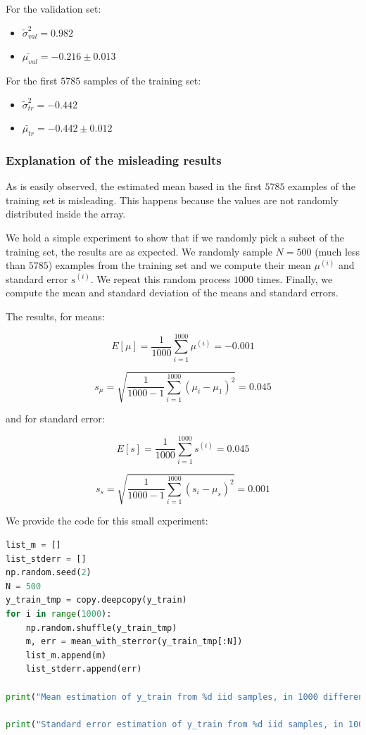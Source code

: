 \documentclass{article}
\begin{document}
For the validation set:
\begin{itemize}
    \item $ \tilde{\sigma}_{val}^2 = 0.982 $
    \item $ \tilde{\mu_{val}} = - 0.216 \pm 0.013 $
\end{itemize}

For the first $5785$ samples of the training set:
\begin{itemize}
    \item $ \tilde{\sigma}_{tr}^2 = -0.442 $
    \item $ \tilde{\mu_{tr}} = - 0.442 \pm 0.012 $
\end{itemize}


\subsubsection*{Explanation of the misleading results}

As is easily observed, the estimated mean based in the first $5785$ examples of the training set is misleading. This happens because the values are not randomly distributed inside the array.

We hold a simple experiment to show that if we randomly pick a subset of the training set, the results are as expected. We randomly sample $N = 500$ (much less than $5785$) examples from the training set and we compute their mean $\mu^{(i)}$ and standard error $s^{(i)}$. We repeat this random process $1000$ times. Finally, we compute the mean and standard deviation of the means and standard errors. 

The results, for means:

$$ \displaystyle  E[\mu] = \frac{1}{1000} \sum_{i=1}^{1000} \mu^{(i)} = -0.001 $$

$$ \displaystyle s_\mu = \sqrt{  \frac{1}{1000 - 1} \sum_{i=1}^{1000} (\mu_i - \mu_1)^2} = 0.045 $$

and for standard error:

$$ \displaystyle  E[s] = \frac{1}{1000} \sum_{i=1}^{1000} s^{(i)} = 0.045 $$

$$ \displaystyle s_s = \sqrt{  \frac{1}{1000 - 1} \sum_{i=1}^{1000} (s_i - \mu_{s})^2} = 0.001 $$

We provide the code for this small experiment:

\begin{lstlisting}[language = Python]
list_m = []
list_stderr = []
np.random.seed(2)
N = 500
y_train_tmp = copy.deepcopy(y_train)
for i in range(1000):
    np.random.shuffle(y_train_tmp)
    m, err = mean_with_sterror(y_train_tmp[:N])
    list_m.append(m)
    list_stderr.append(err)

print("Mean estimation of y_train from %d iid samples, in 1000 different executions has mean: %.3f and standard deviation: %.3f" %(N, np.mean(list_m), np.std(list_m, ddof=1)))

print("Standard error estimation of y_train from %d iid samples, in 1000 different executions has mean: %.3f and standard deviation: %.3f" %(N, np.mean(list_stderr), np.std(list_stderr, ddof = 1)))
\end{lstlisting}
\end{document}
